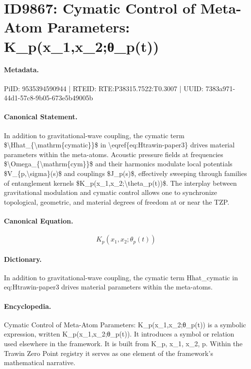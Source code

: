 \section*{ID9867: Cymatic Control of Meta-Atom Parameters: K\_p(x\_1,x\_2;θ\_p(t))}
\paragraph{Metadata.}
PiID: 9535394590944 | RTEID: RTE:P38315.7522:T0.3007 | UUID: 7383a971-44d1-57c8-9b05-673e5b49005b

\paragraph{Canonical Statement.}
In addition to gravitational-wave coupling, the cymatic term \$\textbackslash{}Hhat\_\{\textbackslash{}mathrm\{cymatic\}\}\$ in \textbackslash{}eqref\{eq:Htrawin-paper3\} drives material parameters within the meta-atoms. Acoustic pressure fields at frequencies \$\textbackslash{}Omega\_\{\textbackslash{}mathrm\{cym\}\}\$ and their harmonics modulate local potentials \$V\_\{p,\textbackslash{}sigma\}(s)\$ and couplings \$J\_p(s)\$, effectively sweeping through families of entanglement kernels \$K\_p(x\_1,x\_2;\textbackslash{}theta\_p(t))\$. The interplay between gravitational modulation and cymatic control allows one to synchronize topological, geometric, and material degrees of freedom at or near the TZP.

\paragraph{Canonical Equation.}
\[
K_p(x_1,x_2;\theta_p(t))
\]

\paragraph{Dictionary.}
In addition to gravitational-wave coupling, the cymatic term Hhat\_cymatic in eq:Htrawin-paper3 drives material parameters within the meta-atoms.

\paragraph{Encyclopedia.}
Cymatic Control of Meta-Atom Parameters: K\_p(x\_1,x\_2;θ\_p(t)) is a symbolic expression, written K\_p(x\_1,x\_2;θ\_p(t)). It introduces a symbol or relation used elsewhere in the framework. It is built from K\_p, x\_1, x\_2, p. Within the Trawin Zero Point registry it serves as one element of the framework's mathematical narrative.
